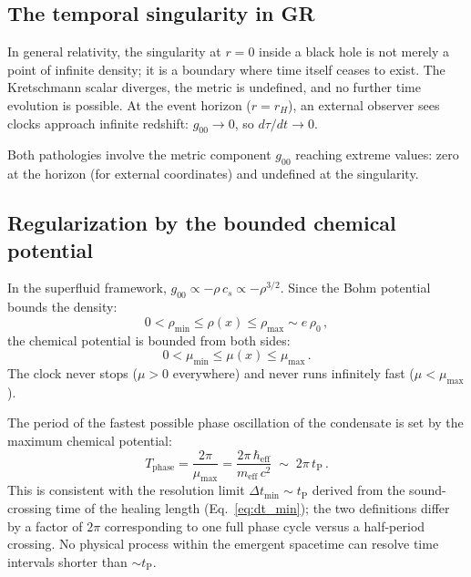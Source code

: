 \documentclass[12pt, a4paper]{article}
\newcommand{\meff}{m_{\mathrm{eff}}}
\newcommand{\heff}{\hbar_{\mathrm{eff}}}
\newcommand{\tP}{t_{\mathrm{P}}}
\begin{document}
\subsection{The temporal singularity in GR}

In general relativity, the singularity at $r = 0$
inside a black hole is not merely a point of
infinite density; it is a boundary where time itself
ceases to exist. The Kretschmann scalar diverges,
the metric is undefined, and no further time
evolution is possible. At the event horizon ($r = r_H$),
an external observer sees clocks approach infinite
redshift: $g_{00} \to 0$, so $d\tau/dt \to 0$.

Both pathologies involve the metric component $g_{00}$
reaching extreme values: zero at the horizon
(for external coordinates) and undefined at the
singularity.

\subsection{Regularization by the bounded chemical potential}

In the superfluid framework, $g_{00} \propto
-\rho\,c_s \propto -\rho^{3/2}$. Since the Bohm
potential bounds the density:
\begin{equation}
    0 < \rho_{\min} \leq \rho(x)
    \leq \rho_{\max} \sim e\,\rho_0\,,
\label{eq:rho_bounds}
\end{equation}
the chemical potential is bounded from both sides:
\begin{equation}
    0 < \mu_{\min} \leq \mu(x) \leq \mu_{\max}\,.
\label{eq:mu_bounds}
\end{equation}
The clock never stops ($\mu > 0$ everywhere) and
never runs infinitely fast ($\mu < \mu_{\max}$).

The period of the fastest possible phase
oscillation of the condensate is set by the maximum
chemical potential:
\begin{equation}
    T_{\mathrm{phase}} = \frac{2\pi}{\mu_{\max}}
    = \frac{2\pi\,\heff}{\meff\,c^2}
    \;\sim\; 2\pi\,\tP\,.
\label{eq:dt_phase}
\end{equation}
This is consistent with the resolution limit
$\Delta t_{\min} \sim \tP$ derived from the
sound-crossing time of the healing length
(Eq.~\ref{eq:dt_min}); the two definitions differ
by a factor of $2\pi$ corresponding to one full
phase cycle versus a half-period crossing. No
physical process within the emergent spacetime can
resolve time intervals shorter than $\sim \tP$.
\end{document}
